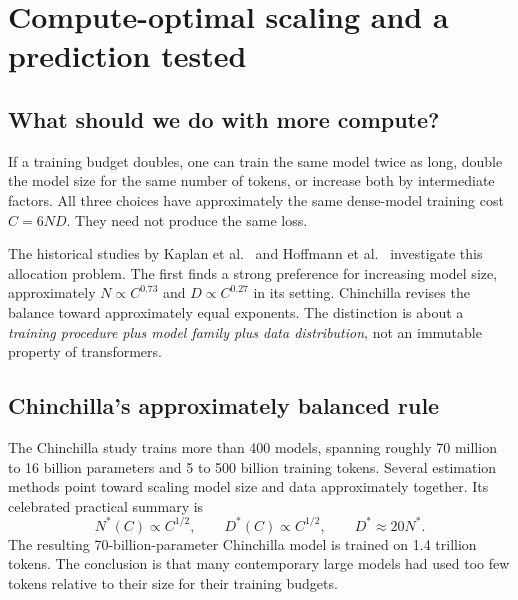 \chapter{Compute-optimal scaling and a prediction tested}
\label{ch:scaling}

\section{What should we do with more compute?}
If a training budget doubles, one can train the same model twice as long, double the model size for the same number of tokens, or increase both by intermediate factors. All three choices have approximately the same dense-model training cost $C=6ND$. They need not produce the same loss.

The historical studies by Kaplan et al.~\cite{kaplan} and Hoffmann et al.~\cite{chinchilla} investigate this allocation problem. The first finds a strong preference for increasing model size, approximately $N\propto C^{0.73}$ and $D\propto C^{0.27}$ in its setting. Chinchilla revises the balance toward approximately equal exponents. The distinction is about a \emph{training procedure plus model family plus data distribution}, not an immutable property of transformers.


\section{Chinchilla's approximately balanced rule}
The Chinchilla study trains more than 400 models, spanning roughly 70 million to 16 billion parameters and 5 to 500 billion training tokens. Several estimation methods point toward scaling model size and data approximately together. Its celebrated practical summary is
\begin{equation}
 N^*(C)\propto C^{1/2},\qquad D^*(C)\propto C^{1/2},
 \qquad D^*\approx20N^*.
\label{eq:chinchilla}
\end{equation}
The resulting 70-billion-parameter Chinchilla model is trained on 1.4 trillion tokens. The conclusion is that many contemporary large models had used too few tokens relative to their size for their training budgets.


